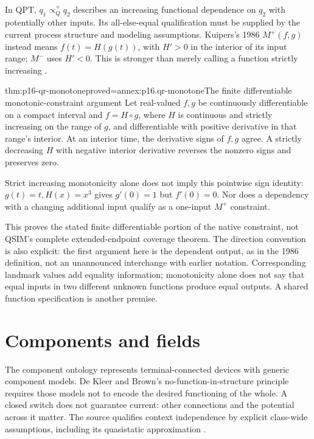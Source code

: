 In QPT, \(q_1\propto_Q^+q_2\) describes an increasing functional
dependence on \(q_2\) with potentially other inputs. Its all-else-equal
qualification must be supplied by the current process structure and modeling
assumptions. Kuipers's 1986 \(M^+(f,g)\) instead means
\(f(t)=H(g(t))\), with \(H'>0\) in the interior of its input range;
\(M^-\) uses \(H'<0\). This is stronger than merely calling a
function strictly increasing \cite[Definitions~3.5--3.6,
pp.~302--303]{Kuipers1986QualitativeSimulation}.

\begin{hbtheorem}{thm:p16-qr-monotone}{proved=annex:p16.qr-monotone}{The finite differentiable monotonic-constraint argument}
Let real-valued \(f,g\) be continuously differentiable on a compact
interval and \(f=H\circ g\), where \(H\) is continuous and strictly
increasing on the range of \(g\), and differentiable with positive
derivative in that range's interior. At an interior time, the derivative
signs of \(f,g\) agree. A strictly decreasing \(H\) with negative
interior derivative reverses the nonzero signs and preserves zero.

Strict increasing monotonicity alone does not imply this pointwise sign
identity: \(g(t)=t,H(x)=x^3\) gives \(g'(0)=1\) but \(f'(0)=0\).
Nor does a dependency with a changing additional input qualify as a
one-input \(M^+\) constraint.
\end{hbtheorem}

This proves the stated finite differentiable portion of the native constraint,
not QSIM's complete extended-endpoint coverage theorem. The direction
convention is also explicit: the first argument here is the dependent output,
as in the 1986 definition, not an unannounced interchange with earlier notation.
Corresponding landmark values add equality information; monotonicity alone
does not say that equal inputs in two different unknown functions produce
equal outputs. A shared function specification is another premise.

\section{Components and fields}
\label{sec:p16-qr-ontologies}

The component ontology represents terminal-connected devices with generic
component models. De Kleer and Brown's no-function-in-structure principle
requires those models not to encode the desired functioning of the whole.
A closed switch does not guarantee current: other connections and the
potential across it matter. The source qualifies context independence by
explicit class-wide assumptions, including its quasistatic approximation
\cite[secs.~2.3--2.5]{DeKleerBrown1984Confluences}.

